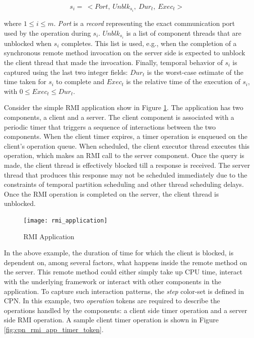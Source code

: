\begin{equation}
s_i = \ <Port, \ Unblk_{s_i}, \ Dur_t, \ Exec_t>
\end{equation}

where $1 \le i \le m$. \emph{Port} is a \emph{record} representing the exact communication port used by the operation during $s_i$. $Unblk_{s_i}$ is a list of component threads that are unblocked when $s_i$ completes. This list is used, e.g., when the completion of a synchronous remote method invocation on the server side is expected to unblock the client thread that made the invocation. Finally, temporal behavior of $s_i$ is captured using the last two integer fields: \emph{$Dur_t$} is the worst-case estimate of the time taken for $s_i$ to complete and $Exec_t$ is the relative time of the execution of $s_i$, with $0 \le Exec_t \le Dur_t$.

Consider the simple RMI application show in Figure \ref{fig:rmi_application}. The application has two components, a client and a server. The client component is associated with a periodic timer that triggers a sequence of interactions between the two components. When the client timer expires, a timer operation is enqueued on the client's operation queue. When scheduled, the client executor thread executes this operation, which makes an RMI call to the server component. Once the query is made, the client thread is effectively blocked till a response is received. The server thread that produces this response may not be scheduled immediately due to the constraints of temporal partition scheduling and other thread scheduling delays. Once the RMI operation is completed on the server, the client thread is unblocked. 

\begin{figure}[ht]
	\centering
	\texttt{[image: rmi\_application]}
	\caption{RMI Application}
	\label{fig:rmi_application}
\end{figure}

In the above example, the duration of time for which the client is blocked, is dependent on, among several factors, what happens inside the remote method on the server. This remote method could either simply take up CPU time, interact with the underlying framework or interact with other components in the application. To capture such interaction patterns, the \emph{step} color-set is defined in CPN. In this example, two \emph{operation} tokens are required to describe the operations handled by the components: a client side timer operation and a server side RMI operation. A sample client timer operation is shown in Figure \ref{fig:cpn_rmi_app_timer_token}.

